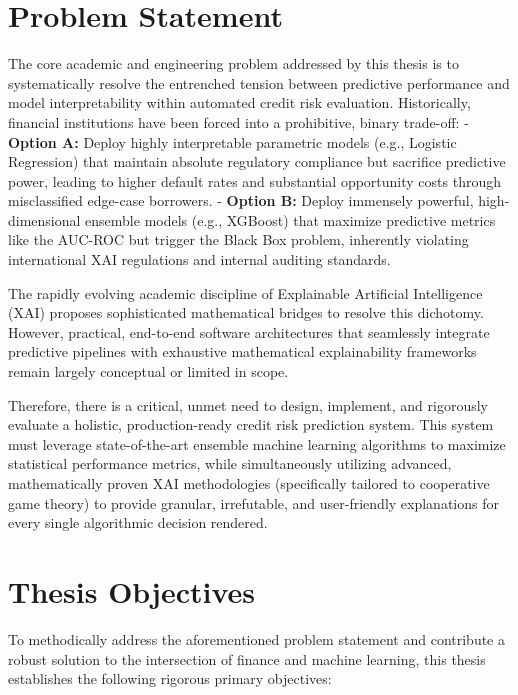 \hypertarget{problem-statement}{%
\section{Problem Statement}\label{problem-statement}}

The core academic and engineering problem addressed by this thesis is to
systematically resolve the entrenched tension between predictive
performance and model interpretability within automated credit risk
evaluation. Historically, financial institutions have been forced into a
prohibitive, binary trade-off: - \textbf{Option A:} Deploy highly
interpretable parametric models (e.g., Logistic Regression) that
maintain absolute regulatory compliance but sacrifice predictive power,
leading to higher default rates and substantial opportunity costs
through misclassified edge-case borrowers. - \textbf{Option B:} Deploy
immensely powerful, high-dimensional ensemble models (e.g., XGBoost)
that maximize predictive metrics like the AUC-ROC but trigger the Black
Box problem, inherently violating international XAI regulations and
internal auditing standards.

The rapidly evolving academic discipline of Explainable Artificial
Intelligence (XAI) proposes sophisticated mathematical bridges to
resolve this dichotomy. However, practical, end-to-end software
architectures that seamlessly integrate predictive pipelines with
exhaustive mathematical explainability frameworks remain largely
conceptual or limited in scope.

Therefore, there is a critical, unmet need to design, implement, and
rigorously evaluate a holistic, production-ready credit risk prediction
system. This system must leverage state-of-the-art ensemble machine
learning algorithms to maximize statistical performance metrics, while
simultaneously utilizing advanced, mathematically proven XAI
methodologies (specifically tailored to cooperative game theory) to
provide granular, irrefutable, and user-friendly explanations for every
single algorithmic decision rendered.

\hypertarget{thesis-objectives}{%
\section{Thesis Objectives}\label{thesis-objectives}}

To methodically address the aforementioned problem statement and
contribute a robust solution to the intersection of finance and machine
learning, this thesis establishes the following rigorous primary
objectives:

